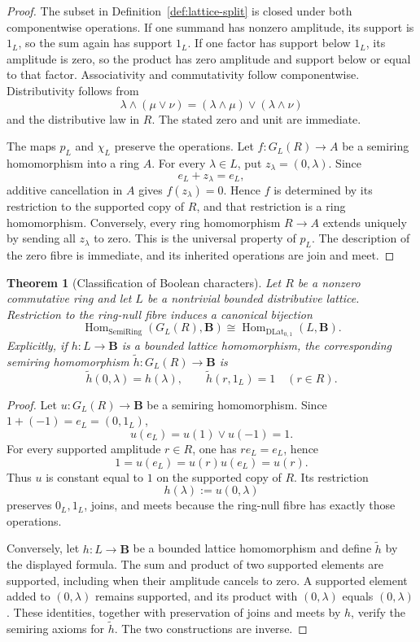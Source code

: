 \documentclass[11pt]{amsart}
\numberwithin{equation}{section}
\newtheorem{theorem}{Theorem}[section]
\theoremstyle{definition}
\newcommand{\B}{\mathbf B}
\newcommand{\Hom}{\operatorname{Hom}}
\DeclareMathOperator{\SemiRing}{SemiRing}
\begin{document}
\begin{proof}
The subset in Definition~\ref{def:lattice-split} is closed under both
componentwise operations.  If one summand has nonzero amplitude, its
support is $1_L$, so the sum again has support $1_L$.  If one factor has
support below $1_L$, its amplitude is zero, so the product has zero
amplitude and support below or equal to that factor.  Associativity and
commutativity follow componentwise.  Distributivity follows from
\[
\lambda\wedge(\mu\vee\nu)
=(\lambda\wedge\mu)\vee(\lambda\wedge\nu)
\]
and the distributive law in $R$.  The stated zero and unit are immediate.

The maps $p_L$ and $\chi_L$ preserve the operations.  Let
$f:G_L(R)\to A$ be a semiring homomorphism into a ring $A$.  For every
$\lambda\in L$, put $z_\lambda=(0,\lambda)$.  Since
\[
e_L+z_\lambda=e_L,
\]
additive cancellation in $A$ gives $f(z_\lambda)=0$.  Hence $f$ is
determined by its restriction to the supported copy of $R$, and that
restriction is a ring homomorphism.  Conversely, every ring homomorphism
$R\to A$ extends uniquely by sending all $z_\lambda$ to zero.  This is the
universal property of $p_L$.  The description of the zero fibre is
immediate, and its inherited operations are join and meet.
\end{proof}


\begin{theorem}[Classification of Boolean characters]
\label{thm:lattice-boolean-characters}
Let $R$ be a nonzero commutative ring and let $L$ be a nontrivial bounded
distributive lattice.  Restriction to the ring-null fibre induces a canonical bijection
\[
\boxed{
\Hom_{\SemiRing}(G_L(R),\B)
\cong
\Hom_{\mathrm{DLat}_{0,1}}(L,\B).
}
\]
Explicitly, if $h:L\to\B$ is a bounded lattice homomorphism, the
corresponding semiring homomorphism $\widetilde h:G_L(R)\to\B$ is
\[
\widetilde h(0,\lambda)=h(\lambda),
\qquad
\widetilde h(r,1_L)=1\quad(r\in R).
\]
\end{theorem}

\begin{proof}
Let $u:G_L(R)\to\B$ be a semiring homomorphism.  Since
$1+(-1)=e_L=(0,1_L)$,
\[
u(e_L)=u(1)\vee u(-1)=1.
\]
For every supported amplitude $r\in R$, one has $r e_L=e_L$, hence
\[
1=u(e_L)=u(r)u(e_L)=u(r).
\]
Thus $u$ is constant equal to $1$ on the supported copy of $R$.  Its
restriction
\[
h(\lambda):=u(0,\lambda)
\]
preserves $0_L,1_L$, joins, and meets because the ring-null fibre has
exactly those operations.

Conversely, let $h:L\to\B$ be a bounded lattice homomorphism and define
$\widetilde h$ by the displayed formula.  The sum and product of two
supported elements are supported, including when their amplitude cancels
to zero.  A supported element added to $(0,\lambda)$ remains supported,
and its product with $(0,\lambda)$ equals $(0,\lambda)$.  These identities,
together with preservation of joins and meets by $h$, verify the semiring
axioms for $\widetilde h$.  The two constructions are inverse.
\end{proof}
\end{document}

